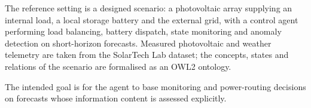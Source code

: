 The reference setting is a designed scenario: a photovoltaic array supplying an internal load, a local storage battery and the external grid, with a control agent performing load balancing, battery dispatch, state monitoring and anomaly detection on short-horizon forecasts. Measured photovoltaic and weather telemetry are taken from the SolarTech Lab dataset\autocite{levaPhotovoltaicPowerWeather2020}; the concepts, states and relations of the scenario are formalised as an OWL2 ontology.

The intended goal is for the agent to base monitoring and power-routing decisions on forecasts whose information content is assessed explicitly.
